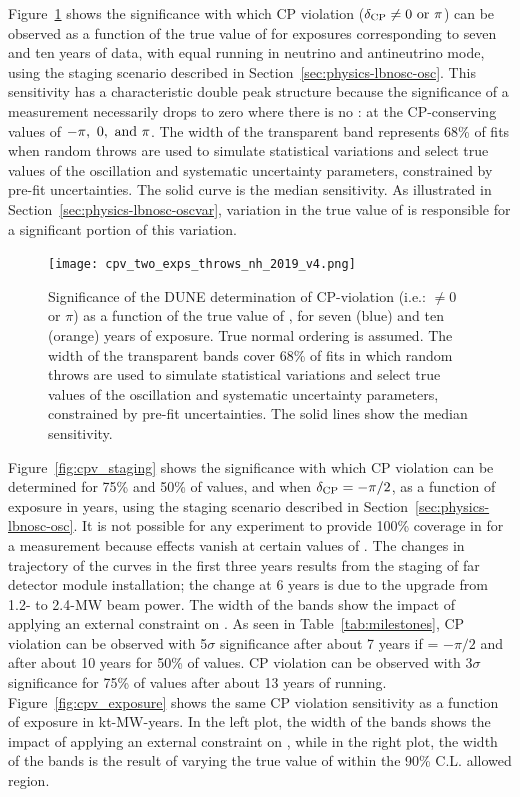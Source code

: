 Figure~\ref{fig:cpv_nominal} shows the significance with which CP
violation ($\mdeltacp \neq 0 \ {\rm or} \ \pi$) can be observed as a
function of the true value of \deltacp for exposures corresponding to seven and ten years of data, with equal running in neutrino and antineutrino mode, using the staging scenario described in Section~\ref{sec:physics-lbnosc-osc}.
This sensitivity has a characteristic double peak
structure because the significance of a  measurement
necessarily drops to zero where there is no : at the
CP-conserving values of $-\pi,~0,~{\rm and}~\pi$. The width of the transparent band represents 68\% of fits when random throws are used to simulate statistical variations and select true values of the oscillation and systematic uncertainty parameters, constrained by pre-fit uncertainties. The solid curve is the median sensitivity. As illustrated in Section~\ref{sec:physics-lbnosc-oscvar}, variation in the true value of  is responsible for a significant portion of this variation.

\begin{figure}[h!]
    \centering
		\texttt{[image: cpv\_two\_exps\_throws\_nh\_2019\_v4.png]}
	\caption[Significance of the DUNE determination of CP-violation as a function of \deltacp]{Significance of the DUNE determination of CP-violation (i.e.: \deltacp $\neq 0$ or $\pi$) as a function of the true value of \deltacp, for seven (blue) and ten (orange) years of exposure. True normal ordering is assumed. The width of the transparent bands cover 68\% of fits in which random throws are used to simulate statistical variations and select true values of the oscillation and systematic uncertainty parameters, constrained by pre-fit uncertainties. The solid lines show the median sensitivity.}
    \label{fig:cpv_nominal}
\end{figure}

Figure~\ref{fig:cpv_staging} shows the significance
with which CP violation can be determined for 75\% and 50\% of \deltacp values, and when $\delta_{\rm CP}=-\pi/2$, as a function of exposure in years, using the staging scenario described in Section~\ref{sec:physics-lbnosc-osc}. It is not possible for any experiment to provide 100\% coverage in \deltacp for a  measurement because  effects vanish at certain values of \deltacp. The changes in trajectory of the curves in the first three years results from the staging of far detector module installation; the change at 6 years is due to the upgrade from 1.2- to 2.4-MW beam power. The width of the bands show the impact of applying an external constraint on . As seen in Table~\ref{tab:milestones}, CP violation can be observed with 5$\sigma$ significance after about 7 years if \deltacp = $-\pi/2$ and after about 10 years for 50\% of \deltacp values. CP violation can be observed with 3$\sigma$ significance for 75\% of \deltacp values after about 13 years of running. Figure~\ref{fig:cpv_exposure} shows the same CP violation sensitivity as a function of exposure in kt-MW-years. In the left plot, the width of the bands shows the impact of applying an external constraint on , while in the right plot, the width of the bands is the result of varying the true value of  within the  90\% C.L. allowed region.

